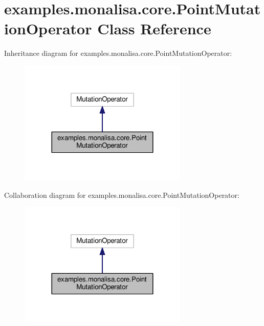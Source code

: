\hypertarget{classexamples_1_1monalisa_1_1core_1_1_point_mutation_operator}{\section{examples.\-monalisa.\-core.\-Point\-Mutation\-Operator Class Reference}
\label{classexamples_1_1monalisa_1_1core_1_1_point_mutation_operator}
}


Inheritance diagram for examples.\-monalisa.\-core.\-Point\-Mutation\-Operator\-:
\nopagebreak
\begin{figure}[H]
\begin{center}
\leavevmode
\includegraphics[width=228pt]{classexamples_1_1monalisa_1_1core_1_1_point_mutation_operator__inherit__graph}
\end{center}
\end{figure}


Collaboration diagram for examples.\-monalisa.\-core.\-Point\-Mutation\-Operator\-:
\nopagebreak
\begin{figure}[H]
\begin{center}
\leavevmode
\includegraphics[width=228pt]{classexamples_1_1monalisa_1_1core_1_1_point_mutation_operator__coll__graph}
\end{center}
\end{figure}
